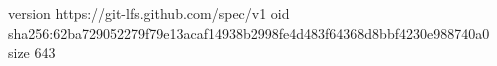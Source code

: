 version https://git-lfs.github.com/spec/v1
oid sha256:62ba729052279f79e13acaf14938b2998fe4d483f64368d8bbf4230e988740a0
size 643
